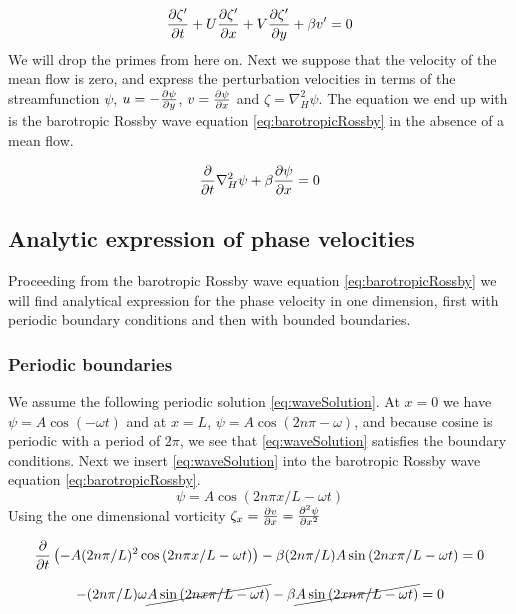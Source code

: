 \begin{equation}
    \pdv{\zeta '}{t} + U\pdv{\zeta'}{x} + V\pdv{\zeta'}{y} + \beta v' = 0
\end{equation}
We will drop the primes from here on. Next we suppose that the velocity of
the mean flow is zero, and express the perturbation velocities in terms of the streamfunction
$\psi$, $u = -\pdv{\psi}{y}$, $v = \pdv{\psi}{x}$ and $\zeta = \nabla_H^2 \psi
$. The equation we end up with is the barotropic Rossby wave equation
\cref{eq:barotropicRossby} in the absence of a mean flow.

\begin{equation}\label{eq:barotropicRossby}
    \pdv{}{t} \nabla_H^2 \psi + \beta \pdv{\psi}{x} = 0
\end{equation}

\subsection{Analytic expression of phase velocities}
Proceeding from the barotropic Rossby wave equation \cref{eq:barotropicRossby}
we will find analytical expression for the phase velocity in
one dimension, first with periodic boundary conditions and then with bounded
boundaries.
\subsubsection{Periodic boundaries}
We assume the following periodic solution \cref{eq:waveSolution}.
At $x=0$ we have $\psi = A\cos{(-\omega t)}$ and at $x = L$, $\psi = A
\cos{(2n\pi -\omega)}$, and because cosine is periodic with a period of $2\pi$,
we see that \cref{eq:waveSolution} satisfies the boundary conditions.
Next we insert \cref{eq:waveSolution} into the barotropic Rossby wave equation
\cref{eq:barotropicRossby}.
\begin{equation}\label{eq:waveSolution}
    \psi = A\cos{(2n\pi x /L - \omega t)}
\end{equation}
Using the one dimensional vorticity $\zeta_x = \pdv{v}{x} = \pdv[2]{\psi}{x}$

\begin{equation}
    \pdv{}{t} \left(-A (2n\pi/L)^2  \cos{(2n\pi x/L - \omega t)}\right) - \beta
     (2n\pi/L) A \sin{(2n x\pi/L - \omega t) = 0}
\end{equation}

\begin{equation}
    -(2n\pi/L)\omega \cancel{A\sin{(2n x\pi/L - \omega t)}} - \beta
    \cancel{A\sin{(2 xn\pi/L - \omega t)}} = 0
\end{equation}

